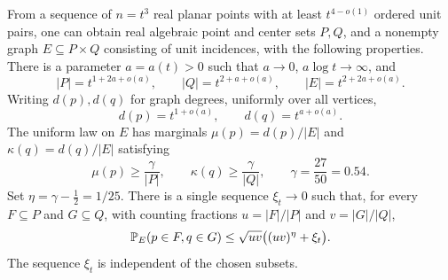 \begin{proposition}\label{inc:piece}
From a sequence of \(n=t^3\) real planar points with at least
\(t^{4-o(1)}\) ordered unit pairs, one can obtain real algebraic point
and center sets \(P,Q\), and a nonempty graph \(E\subseteq P\times Q\)
consisting of unit incidences, with the following properties. There is
a parameter \(a=a(t)>0\) such that \(a\to0\),
\(a\log t\to\infty\), and
\begin{equation}\label{inc:scales}
 |P|=t^{1+2a+o(a)},\qquad
 |Q|=t^{2+a+o(a)},\qquad
 |E|=t^{2+2a+o(a)}.
\end{equation}
Writing \(d(p),d(q)\) for graph degrees, uniformly over all vertices,
\begin{equation}\label{inc:degrees}
 d(p)=t^{1+o(a)},\qquad d(q)=t^{a+o(a)}.
\end{equation}
The uniform law on \(E\) has marginals
\(\mu(p)=d(p)/|E|\) and \(\kappa(q)=d(q)/|E|\) satisfying
\begin{equation}\label{inc:marginal-atoms}
 \mu(p)\ge\frac{\gamma}{|P|},\qquad
 \kappa(q)\ge\frac{\gamma}{|Q|},\qquad
 \gamma=\frac{27}{50}=0.54.
\end{equation}
Set \(\eta=\gamma-\tfrac12=1/25\). There is a single sequence
\(\xi_t\to0\) such that, for every \(F\subseteq P\) and
\(G\subseteq Q\), with counting fractions
\(u=|F|/|P|\) and \(v=|G|/|Q|\),
\begin{equation}\label{inc:expansion}
 \mathbb P_E(p\in F,q\in G)
 \le \sqrt{uv}\bigl((uv)^\eta+\xi_t\bigr).
\end{equation}
The sequence \(\xi_t\) is independent of the chosen subsets.
\end{proposition}

